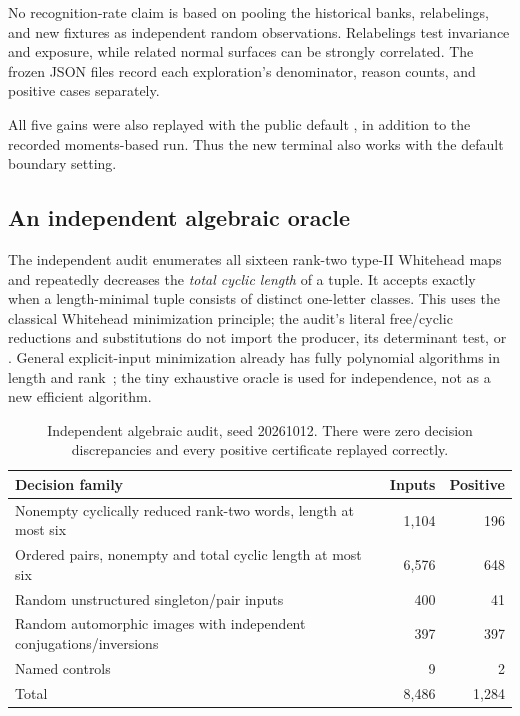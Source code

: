 \documentclass[11pt,a4paper]{article}
\theoremstyle{definition}
\theoremstyle{remark}
\newcommand{\code}[1]{\texttt{\small\detokenize{#1}}}
\begin{document}
No recognition-rate claim is based on pooling the historical banks,
relabelings, and new fixtures as independent random observations. Relabelings
test invariance and exposure, while related normal surfaces can be strongly
correlated. The frozen JSON files record each exploration's denominator,
reason counts, and positive cases separately.

All five gains were also replayed with the public default
\code{boundary_method='masks'}, in addition to the recorded moments-based
run. Thus the new terminal also works with the default boundary setting.

\subsection{An independent algebraic oracle}

The independent audit enumerates all sixteen rank-two type-II Whitehead
maps and repeatedly decreases the \emph{total cyclic length} of a tuple.
It accepts exactly when a length-minimal tuple consists of distinct
one-letter classes. This uses the classical Whitehead minimization
principle; the audit's literal free/cyclic reductions and substitutions do
not import the producer, its determinant test, or \code{WordArena}.
General explicit-input minimization already has fully polynomial algorithms
in length and rank~\cite{roig2007}; the tiny exhaustive oracle is used for
independence, not as a new efficient algorithm.

\begin{table}[ht]
\centering\small
\begin{tabularx}{\textwidth}{@{}Yr r@{}}
\toprule
Decision family & Inputs & Positive\\
\midrule
Nonempty cyclically reduced rank-two words, length at most six & 1,104 & 196\\
Ordered pairs, nonempty and total cyclic length at most six & 6,576 & 648\\
Random unstructured singleton/pair inputs & 400 & 41\\
Random automorphic images with independent conjugations/inversions & 397 & 397\\
Named controls & 9 & 2\\
\midrule
Total & 8,486 & 1,284\\
\bottomrule
\end{tabularx}
\caption{Independent algebraic audit, seed 20261012. There were zero
decision discrepancies and every positive certificate replayed correctly.}
\label{tab:audit}
\end{table}
\end{document}
